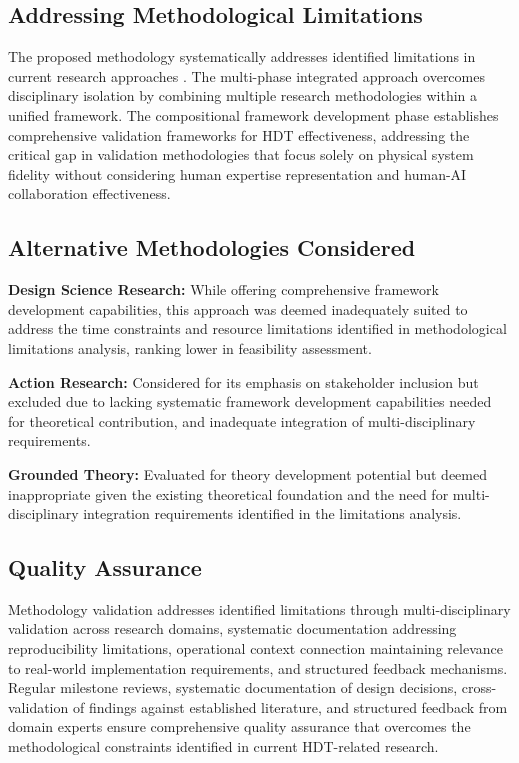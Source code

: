 \documentclass[12pt,a4paper]{article}
\begin{document}
\subsection{Addressing Methodological Limitations}

The proposed methodology systematically addresses identified limitations in current research approaches \cite{10.1186/s10033-024-00998-7} \cite{10.1016/j.ifacol.2022.09.675}. The multi-phase integrated approach overcomes disciplinary isolation by combining multiple research methodologies within a unified framework. The compositional framework development phase establishes comprehensive validation frameworks for HDT effectiveness, addressing the critical gap in validation methodologies that focus solely on physical system fidelity without considering human expertise representation and human-AI collaboration effectiveness.

\subsection{Alternative Methodologies Considered}

\noindent \textbf{Design Science Research:} While offering comprehensive framework development capabilities, this approach was deemed inadequately suited to address the time constraints and resource limitations identified in methodological limitations analysis, ranking lower in feasibility assessment.

\noindent \textbf{Action Research:} Considered for its emphasis on stakeholder inclusion but excluded due to lacking systematic framework development capabilities needed for theoretical contribution, and inadequate integration of multi-disciplinary requirements.

\noindent \textbf{Grounded Theory:} Evaluated for theory development potential but deemed inappropriate given the existing theoretical foundation and the need for multi-disciplinary integration requirements identified in the limitations analysis.

\subsection{Quality Assurance}

Methodology validation addresses identified limitations through multi-disciplinary validation across research domains, systematic documentation addressing reproducibility limitations, operational context connection maintaining relevance to real-world implementation requirements, and structured feedback mechanisms. Regular milestone reviews, systematic documentation of design decisions, cross-validation of findings against established literature, and structured feedback from domain experts ensure comprehensive quality assurance that overcomes the methodological constraints identified in current HDT-related research.
\end{document}
